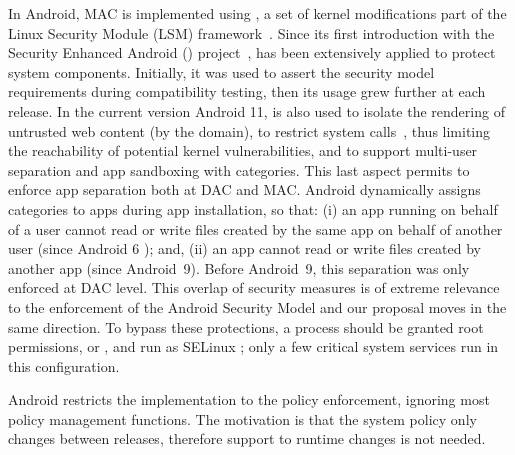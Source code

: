 In Android, MAC is implemented using \sea, a set of kernel
modifications part of the Linux Security Module (LSM)
framework~\cite{seapp_lsm_fra}.  Since its first introduction with the
Security Enhanced Android (\sea) project~\cite{seapp_seandroid}, \sel
has been extensively applied to protect system components.  Initially,
it was used to assert the security model requirements during
compatibility testing, then its usage grew further at each release.
In the current version Android 11, \sel is also used to isolate the
rendering of untrusted web content (by the \isolatedapp domain), to
restrict \ioctl system calls~\cite{seapp_restrioctly}, thus limiting
the reachability of potential kernel vulnerabilities, and to support
multi-user separation and app sandboxing with \sel categories.  This
last aspect permits to enforce app separation both at DAC and MAC.
Android dynamically assigns categories to apps during app
installation, so that: (i) an app running on behalf of a user cannot
read or write files created by the same app on behalf of another user
(since Android 6 \cite{seapp_android6_per_user}); and, (ii) an app
cannot read or write files created by another app (since
Android~9\cite{seapp_android9_per_app}).  Before Android~9, this
separation was only enforced at DAC level.  This overlap of security
measures is of extreme relevance to the enforcement of the Android
Security Model and our proposal moves in the same direction.  To
bypass these protections, a process should be granted root
permissions, \dacoverride or \dacreadsearch, and run as SELinux
\mlstrustedsubject; only a few critical system services run in this
configuration.

Android restricts the \sel implementation to the policy enforcement,
ignoring most policy management functions.  The motivation is that the
system policy only changes between releases, therefore support to
runtime changes is not needed.

